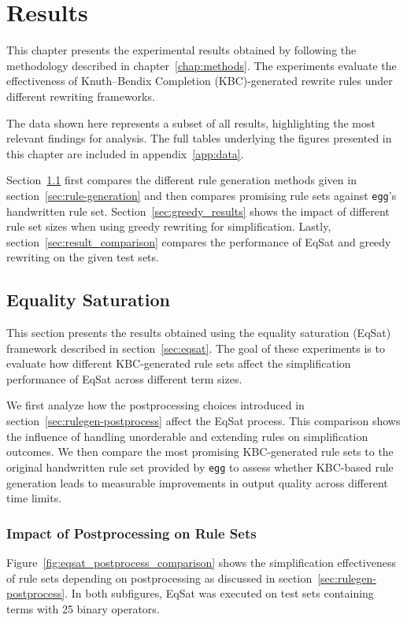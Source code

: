 \chapter{Results}
\label{chap:results}

This chapter presents the experimental results obtained by following the methodology described in chapter~\ref{chap:methods}. The experiments evaluate the effectiveness of Knuth–Bendix Completion (KBC)-generated rewrite rules under different rewriting frameworks.

The data shown here represents a subset of all results, highlighting the most relevant findings for analysis. The full tables underlying the figures presented in this chapter are included in appendix~\ref{app:data}.

Section~\ref{sec:EqSat_results} first compares the different rule generation methods given in section~\ref{sec:rule-generation} and then compares promising rule sets against \texttt{egg}'s handwritten rule set. Section~\ref{sec:greedy_results} shows the impact of different rule set sizes when using greedy rewriting for simplification. Lastly, section~\ref{sec:result_comparison} compares the performance of EqSat and greedy rewriting on the given test sets.

\section{Equality Saturation}
\label{sec:EqSat_results}

This section presents the results obtained using the equality saturation (EqSat) framework described in section~\ref{sec:eqsat}. The goal of these experiments is to evaluate how different KBC-generated rule sets affect the simplification performance of EqSat across different term sizes.

We first analyze how the postprocessing choices introduced in section~\ref{sec:rulegen-postprocess} affect the EqSat process. This comparison shows the influence of handling unorderable and extending rules on simplification outcomes. We then compare the most promising KBC-generated rule sets to the original handwritten rule set provided by \texttt{egg} to assess whether KBC-based rule generation leads to measurable improvements in output quality across different time limits.

\subsection{Impact of Postprocessing on Rule Sets}
\label{sec:impact_postprocessing}
Figure~\ref{fig:eqsat_postprocess_comparison} shows the simplification effectiveness of rule sets depending on postprocessing as discussed in section~\ref{sec:rulegen-postprocess}. In both subfigures, EqSat was executed on test sets containing terms with 25 binary operators.

